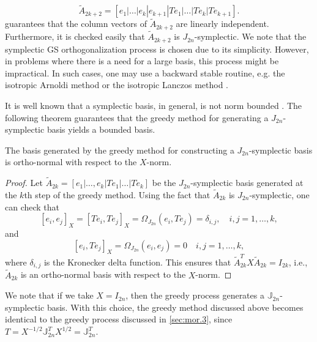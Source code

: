 \begin{equation} \label{eq:normmor.11}
	\tilde A_{2k+2} = [e_1|\dots|e_k|e_{k+1}|Te_1|\dots|Te_k|Te_{k+1}].
\end{equation}
 guarantees that the column vectors of $\tilde A_{2k+2}$ are linearly independent. Furthermore, it is checked easily that $\tilde A_{2k+2}$ is $J_{2n}$-symplectic. We note that the symplectic GS orthogonalization process is chosen due to its simplicity. However, in problems where there is a need for a large basis, this process might be impractical. In such cases, one may use a backward stable routine, e.g. the isotropic Arnoldi method or the isotropic Lanczos method \cite{doi:10.1137/S1064827500366434}.

It is well known that a symplectic basis, in general, is not norm bounded \cite{doi:10.1137/050628519}. The following theorem guarantees that the greedy method for generating a $J_{2n}$-symplectic basis yields a bounded basis.
\begin{theorem} \label{thm:3}
The basis generated by the greedy method for constructing a $J_{2n}$-symplectic basis is ortho-normal with respect to the $X$-norm.
\end{theorem}
\begin{proof}
Let $\tilde A_{2k}=[e_1|\dots,e_k|Te_1|\dots|Te_k]$ be the $J_{2n}$-symplectic basis generated at the $k$th step of the greedy method. Using the fact that $\tilde A_{2k}$ is $J_{2n}$-symplectic, one can check that
\begin{equation} \label{eq:normmor.12}
	[e_i,e_j]_X = [Te_i,Te_j]_X = \Omega_{J_{2n}}(e_i,Te_j)=\delta_{i,j}, \quad i,j=1,\dots,k,	
\end{equation}
and
\begin{equation} \label{eq:normmor.13}
	[e_i,Te_j]_X = \Omega_{J_{2n}}(e_i,e_j) = 0\quad i,j=1,\dots,k,
\end{equation}
where $\delta_{i,j}$ is the Kronecker delta function. This ensures that $\tilde A_{2k}^TX\tilde A_{2k} = I_{2k}$, i.e., $\tilde A_{2k}$ is an ortho-normal basis with respect to the $X$-norm.
\end{proof}
We note that if we take $X=I_{2n}$, then the greedy process generates a $\mathbb J_{2n}$- symplectic basis. With this choice, the greedy method discussed above becomes identical to the greedy process discussed in \cref{sec:mor.3}, since $T = X^{-1/2}\mathbb J_{2n}^TX^{1/2} = \mathbb J_{2n}^T$.

